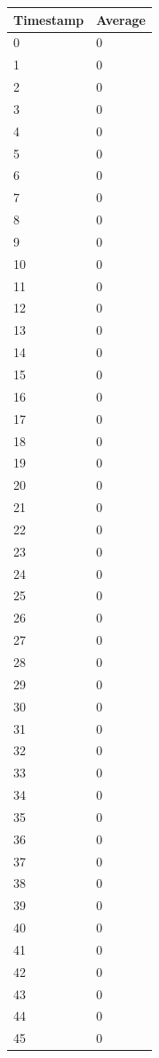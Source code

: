 \begin{tabular}{|l||l|}
\hline
	\textbf{Timestamp} & \textbf{Average} \\ \hline
	0 & 0 \\ \hline
	1 & 0 \\ \hline
	2 & 0 \\ \hline
	3 & 0 \\ \hline
	4 & 0 \\ \hline
	5 & 0 \\ \hline
	6 & 0 \\ \hline
	7 & 0 \\ \hline
	8 & 0 \\ \hline
	9 & 0 \\ \hline
	10 & 0 \\ \hline
	11 & 0 \\ \hline
	12 & 0 \\ \hline
	13 & 0 \\ \hline
	14 & 0 \\ \hline
	15 & 0 \\ \hline
	16 & 0 \\ \hline
	17 & 0 \\ \hline
	18 & 0 \\ \hline
	19 & 0 \\ \hline
	20 & 0 \\ \hline
	21 & 0 \\ \hline
	22 & 0 \\ \hline
	23 & 0 \\ \hline
	24 & 0 \\ \hline
	25 & 0 \\ \hline
	26 & 0 \\ \hline
	27 & 0 \\ \hline
	28 & 0 \\ \hline
	29 & 0 \\ \hline
	30 & 0 \\ \hline
	31 & 0 \\ \hline
	32 & 0 \\ \hline
	33 & 0 \\ \hline
	34 & 0 \\ \hline
	35 & 0 \\ \hline
	36 & 0 \\ \hline
	37 & 0 \\ \hline
	38 & 0 \\ \hline
	39 & 0 \\ \hline
	40 & 0 \\ \hline
	41 & 0 \\ \hline
	42 & 0 \\ \hline
	43 & 0 \\ \hline
	44 & 0 \\ \hline
	45 & 0 \\ \hline
\end{tabular}
